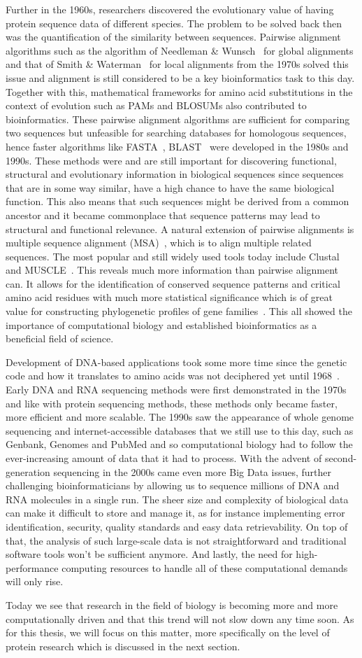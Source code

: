 Further in the 1960s, researchers discovered the evolutionary value of having protein sequence data of different species. The problem to be solved back then was the quantification of the similarity between sequences. Pairwise alignment algorithms such as the algorithm of Needleman \& Wunsch~\cite{global} for global alignments and that of Smith \& Waterman~\cite{local} for local alignments from the 1970s solved this issue and alignment is still considered to be a key bioinformatics task to this day. Together with this, mathematical frameworks for amino acid substitutions in the context of evolution such as PAMs and BLOSUMs also contributed to bioinformatics. These pairwise alignment algorithms are sufficient for comparing two sequences but unfeasible for searching databases for homologous sequences, hence faster algorithms like FASTA~\cite{fasta}, BLAST~\cite{blast} were developed in the 1980s and 1990s. These methods were and are still important for discovering functional, structural and evolutionary information in biological sequences since sequences that are in some way similar, have a high chance to have the same biological function. This also means that such sequences might be derived from a common ancestor and it became commonplace that sequence patterns may lead to structural and functional relevance. A natural extension of pairwise alignments is multiple sequence alignment (MSA)~\cite{msa}, which is to align multiple related sequences. The most popular and still widely used tools today include Clustal~\cite{clustal} and MUSCLE~\cite{muscle}. This reveals much more information than pairwise alignment can. It allows for the identification of conserved sequence patterns and critical amino acid residues with much more statistical significance which is of great value for constructing phylogenetic profiles of gene families~\cite{phylo}. This all showed the importance of computational biology and established bioinformatics as a beneficial field of science.

Development of DNA-based applications took some more time since the genetic code and how it translates to amino acids was not deciphered yet until 1968~\cite{codon}. Early DNA and RNA sequencing methods were first demonstrated in the 1970s~\cite{dnaseq, rna} and like with protein sequencing methods, these methods only became faster, more efficient and more scalable. The 1990s saw the appearance of whole genome sequencing and internet-accessible databases that we still use to this day, such as Genbank, Genomes and PubMed and so computational biology had to follow the ever-increasing amount of data that it had to process. With the advent of second-generation sequencing in the 2000s came even more Big Data issues, further challenging bioinformaticians by allowing us to sequence millions of DNA and RNA molecules in a single run. The sheer size and complexity of biological data can make it difficult to store and manage it, as for instance implementing error identification, security, quality standards and easy data retrievability. On top of that, the analysis of such large-scale data is not straightforward and traditional software tools won't be sufficient anymore. And lastly, the need for high-performance computing resources to handle all of these computational demands will only rise.

Today we see that research in the field of biology is becoming more and more computationally driven and that this trend will not slow down any time soon. As for this thesis, we will focus on this matter, more specifically on the level of protein research which is discussed in the next section.